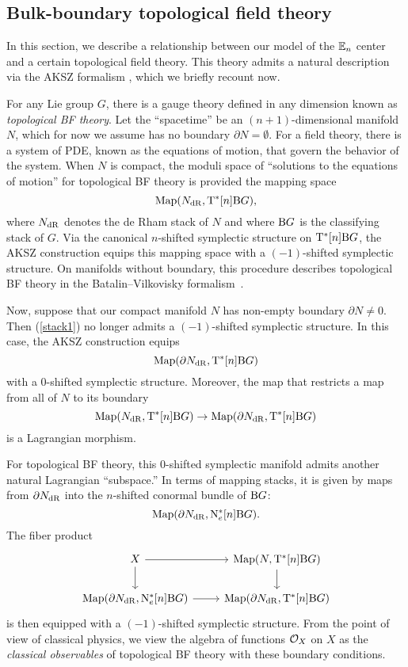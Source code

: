 \documentclass[11pt]{amsart}
\numberwithin{equation}{section}
\begin{document}
\subsection{Bulk-boundary topological field theory}

In this section, we describe a relationship between our model of the $\mathbb E_n$ center and a certain topological field theory. 
This theory admits a natural description via the AKSZ formalism \cite{AKSZ}, which we briefly recount now. 

For any Lie group $G$, there is a gauge theory defined in any dimension known as {\em topological BF theory}.
Let the ``spacetime'' be an $(n+1)$-dimensional manifold $N$, 
which for now we assume has no boundary $\partial N = \emptyset$. 
For a field theory, there is a system of PDE, known as the equations of motion, that govern the behavior of the system.
When $N$ is compact, the moduli space of ``solutions to the equations of motion'' for topological BF theory is provided the mapping space 
\begin{equation} 
\label{stack1}
{\rm Map}(N_{\rm dR} ,  {\rm T}^*[n] {\rm B} G),
\end{equation}
where $N_{\rm dR}$ denotes the de Rham stack of $N$ and where ${\rm B}G$ is the classifying stack of $G$.
Via the canonical $n$-shifted symplectic structure on ${\rm T}^* [n] {\rm B} G$, 
the AKSZ construction equips this mapping space with a $(-1)$-shifted symplectic structure. 
On manifolds without boundary, this procedure describes topological BF theory in the Batalin--Vilkovisky formalism~\cite{BV}. 

Now, suppose that our compact manifold $N$ has non-empty boundary $\partial N \ne 0$.
Then (\ref{stack1}) no longer admits a $(-1)$-shifted symplectic structure. 
In this case, the AKSZ construction equips 
\[
{\rm Map}(\partial N_{\rm dR} , {\rm T}^* [n] {\rm B} G)
\]
with a $0$-shifted symplectic structure. 
Moreover, the map that restricts a map from all of $N$ to its boundary
\[
{\rm Map}(N_{\rm dR} , {\rm T}^* [n] {\rm B} G) \to {\rm Map}(\partial N_{\rm dR} , {\rm T}^* [n] {\rm B} G)
\]
is a Lagrangian morphism. 

For topological BF theory, this $0$-shifted symplectic manifold admits another natural Lagrangian ``subspace.'' 
In terms of mapping stacks, it is given by maps from $\partial N_{\rm dR}$ into the $n$-shifted conormal bundle of ${\rm B} G$:
\[
{\rm Map}(\partial N_{\rm dR} , {\rm N}^*_e [n] {\rm B}G) .
\]
The fiber product
\[
\begin{tikzcd}
X \ar[r] \ar[d] & {\rm Map} (N , {\rm T}^* [n] {\rm B} G) \ar[d] \\
{\rm Map}(\partial N_{\rm dR} , {\rm N}^*_e  [n] {\rm B}G) \ar[r] & {\rm Map}(\partial N_{\rm dR} , {\rm T}^*[n]  {\rm B}G)
\end{tikzcd}
\]
is then equipped with a $(-1)$-shifted symplectic structure. 
From the point of view of classical physics, 
we view the algebra of functions $\mathcal O_X$ on $X$ as the {\em classical observables} of topological BF theory with these boundary conditions.
\end{document}
